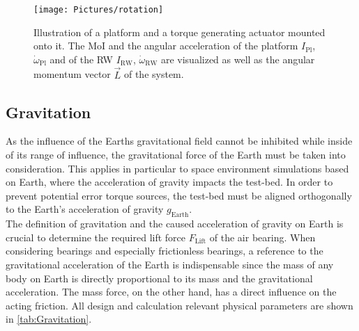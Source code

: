 \begin{figure}[H]
{\centering
\texttt{[image: Pictures/rotation]}
\caption{Illustration of a platform and a torque generating actuator mounted onto it. The MoI and the angular acceleration of the platform $I_\text{Pl}$, $\dot{\omega}_\text{Pl}$ and of the RW $I_\text{RW}$, $\dot{\omega}_\text{RW}$ are visualized as well as the angular momentum vector $\vec{L}$ of the system.}
\label{fig:rotation}
}
\end{figure}


\subsection{Gravitation}
As the influence of the Earths gravitational field cannot be inhibited while inside of its range of influence, the gravitational force of the Earth must be taken into consideration.
This applies in particular to space environment simulations based on Earth, where the acceleration of gravity impacts the test-bed.
In order to prevent potential error torque sources, the test-bed must be aligned orthogonally to the Earth's acceleration of gravity $g_\text{Earth}$.\\

The definition of gravitation and the caused acceleration of gravity on Earth is crucial to determine the required lift force $F_\text{Lift}$ of the air bearing. When considering bearings and especially frictionless bearings, a reference to the gravitational acceleration of the Earth is indispensable since the mass of any body on Earth is directly proportional to its mass and the gravitational acceleration. The mass force, on the other hand, has a direct influence on the acting friction. All design and calculation relevant physical parameters are shown in \autoref{tab:Gravitation}.


\begin{table}[H]
\centering
{}
\caption{Physical parameters of the Earth environment \cite{Messerschmid.2017}.}
\label{tab:Gravitation}
\end{table}


